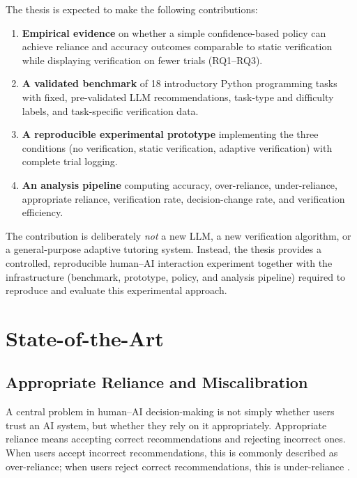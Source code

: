 \documentclass[oneside,final,14pt,a4paper]{extreport}
\theoremstyle{definition}
\theoremstyle{remark}
\begin{document}
The thesis is expected to make the following contributions:
\begin{enumerate}
    \item \textbf{Empirical evidence} on whether a simple confidence-based
    policy can achieve reliance and accuracy outcomes comparable to static
    verification while displaying verification on fewer trials (RQ1--RQ3).
    \item \textbf{A validated benchmark} of 18 introductory Python programming
    tasks with fixed, pre-validated LLM recommendations, task-type and
    difficulty labels, and task-specific verification data.
    \item \textbf{A reproducible experimental prototype} implementing the three
    conditions (no verification, static verification, adaptive verification)
    with complete trial logging.
    \item \textbf{An analysis pipeline} computing accuracy, over-reliance,
    under-reliance, appropriate reliance, verification rate, decision-change
    rate, and verification efficiency.
\end{enumerate}

The contribution is deliberately \emph{not} a new LLM, a new verification
algorithm, or a general-purpose adaptive tutoring system. Instead, the thesis
provides a controlled, reproducible human--AI interaction experiment together
with the infrastructure (benchmark, prototype, policy, and analysis pipeline)
required to reproduce and evaluate this experimental approach.

\section{State-of-the-Art}

\subsection{Appropriate Reliance and Miscalibration}
A central problem in human--AI decision-making is not simply whether users
trust an AI system, but whether they rely on it appropriately. Appropriate
reliance means accepting correct recommendations and rejecting incorrect ones.
When users accept incorrect recommendations, this is commonly described as
over-reliance; when users reject correct recommendations, this is under-reliance
\cite{PoursabziSangdeh2021}.
\end{document}
